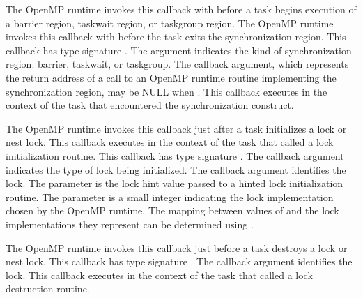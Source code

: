 \documentclass{article}
\newcommand{\descheader}[1]{{\needspace{3\baselineskip}\vspace{1em}\noindent \fbox{#1}}}
\begin{document}
\begin{description}
 
\item {}

 \sloppy
  The OpenMP runtime invokes this callback with  before a task
  begins execution of a barrier region, taskwait region, or taskgroup region. 
   The OpenMP runtime invokes this callback with  before the task exits the synchronization region. 
 This callback has type signature . 
  The argument  indicates the kind of synchronization region: barrier, taskwait, or taskgroup.
  The  callback argument, which represents the return address of a call to an OpenMP runtime routine implementing the synchronization region,
  may be NULL when .
  This callback executes in the context of the task that encountered the synchronization construct.

\end{description}

\descheader{Lock Creation and Destruction}

\begin{description}

\item {}
 
   The OpenMP runtime invokes this callback just after a
   task initializes a lock or nest lock.  This callback executes in the
   context of the task that called a lock initialization routine.
   This callback has type signature . 
   The callback argument  indicates the type of lock being initialized.
   The callback argument  identifies the lock. 
   The  parameter is the lock hint value passed to a hinted lock initialization routine.
   The  parameter is a small integer indicating the lock implementation chosen by the OpenMP runtime. 
   The mapping between values of  and the lock implementations they represent can be determined using 
   . 

\item {}
 
   The OpenMP runtime invokes this callback just before a
   task destroys a lock or nest lock.  
   This callback has type signature . 
   The callback argument  identifies the lock. 
   This callback executes in the context of the task that called a lock destruction routine.

\end{description}
\end{document}
